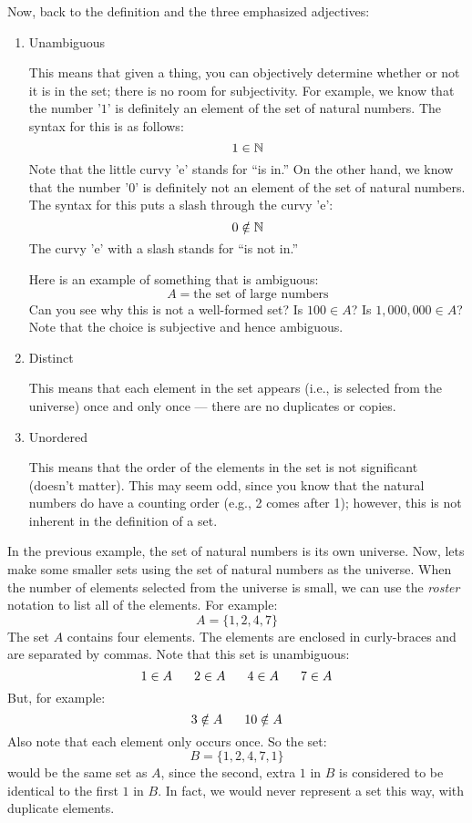 \documentclass[letterpaper,12pt,fleqn]{article}
\begin{document}
Now, back to the definition and the three emphasized adjectives:
\begin{enumerate}
\item Unambiguous

  This means that given a thing, you can objectively determine whether or not
  it is in the set; there is no room for subjectivity. For example, we know
  that the number '$1$' is definitely an element of the set of natural numbers.
  The syntax for this is as follows:
  \[1\in\mathbb{N}\]
  Note that the little curvy 'e' stands for ``is in.'' On the other hand, we
  know that the number '$0$' is definitely not an element of the set of
  natural numbers. The syntax for this puts a slash through the curvy 'e':
  \[0\notin\mathbb{N}\]
  The curvy 'e' with a slash stands for ``is not in.''

  Here is an example of something that is ambiguous:
  \[A=\mbox{the set of large numbers}\]
  Can you see why this is not a well-formed set? Is $100\in A$? Is
  $1,000,000\in A$? Note that the choice is subjective and hence ambiguous.

\item Distinct

  This means that each element in the set appears (i.e., is selected from the
  universe) once and only once --- there are no duplicates or copies.

\item Unordered

  This means that the order of the elements in the set is not significant
  (doesn't matter). This may seem odd, since you know that the natural numbers
  do have a counting order (e.g., 2 comes after 1); however, this is not
  inherent in the definition of a set.
\end{enumerate}

In the previous example, the set of natural numbers is its own universe. Now,
lets make some smaller sets using the set of natural numbers as the universe.
When the number of elements selected from the universe is small, we can use the
\emph{roster} notation to list all of the elements. For example:
\[A=\{1,2,4,7\}\]
The set $A$ contains four elements. The elements are enclosed in curly-braces
and are separated by commas. Note that this set is unambiguous:
\[1\in A\hspace{4ex}2\in A\hspace{4ex}4\in A\hspace{4ex}7\in A\]
But, for example:
\[3\notin A\hspace{4ex}10\notin A\]
Also note that each element only occurs once. So the set:
\[B=\{1,2,4,7,1\}\]
would be the same set as $A$, since the second, extra $1$ in $B$ is considered
to be identical to the first $1$ in $B$. In fact, we would never represent a
set this way, with duplicate elements.
\end{document}
